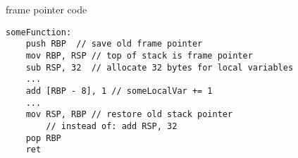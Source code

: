 \begin{frame}[fragile,label=framePointerCode]{frame pointer code}
    \lstset{language=myasm}
\begin{lstlisting}
someFunction:
    push RBP  // save old frame pointer
    mov RBP, RSP // top of stack is frame pointer
    sub RSP, 32  // allocate 32 bytes for local variables
    ...
    add [RBP - 8], 1 // someLocalVar += 1
    ...
    mov RSP, RBP // restore old stack pointer
        // instead of: add RSP, 32
    pop RBP
    ret
\end{lstlisting}
\end{frame}
